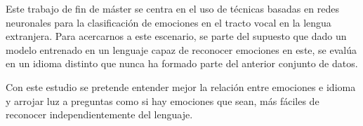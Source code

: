 \documentclass[11pt,a4paper,spanish]{book}
\begin{document}
	Este trabajo de fin de máster se centra en el uso de técnicas basadas en redes neuronales para la clasificación de emociones en el tracto vocal en la lengua extranjera. Para acercarnos a este escenario, se parte del supuesto que dado un modelo entrenado en un lenguaje capaz de reconocer emociones en este, se evalúa en un idioma distinto que nunca ha formado parte del anterior conjunto de datos. 
	
	Con este estudio se pretende entender mejor la relación entre emociones e idioma y arrojar luz a preguntas como si hay emociones que sean,  más fáciles de reconocer independientemente del lenguaje. 
	\begin{comment}
		[Estado del Arte]
		La expresión de las emociones están íntimamente relacionadas con las propiedades fonéticas en el habla donde se observan señales y patrones para marcar contrastes lingüísticos en un idioma \cite{Pell2001} por lo tanto, los efectos del lenguaje en la comunicación emocional son evidentes al haber sido observadas y medidas, las variaciones en el rango tonal y la frecuencia para expresarlas, cambiando no sólo el tono si no también el patrón lingüístico asociado \cite{Davletcharova2015}.
		[]
		 Por ejemplo la tristeza tiende a mostrarse con un tono notablemente bajo mientras que la felicidad, la sorpresa, o el enfado son producidas con un tono moderadamente alto. En general se esperaría que las expresiones de tristeza y enfado tiendan a marcar una mayor diferencia entre ellas y por lo tanto sean reconocidas con más precisión con independencia del lenguaje al estar situadas en los extremos (opuestos) del espectro.
		En literatura anterior \cite{Pell2011} se argumenta que las 6 emociones básicas felicidad, miedo, asco, sorpresa, enfado y tristeza) son exitósamente reconocidas desde la prosodia. Cabe destacar la diferencia entre prosodia y la calidad vocal, donde la primera se centra en características tales como la entonación, el estrés y el ritmo del habla mientras que la segunda se refiere al tono, energía y tempo \cite{Processing2015}.
		  
		[Estado del Arte]
		Por otro lado tanto la proporción de consonantes y vocales (que hacen variar la presión de aire que se necesita) como el ratio de sílabas por palabra en cada idioma, caracterizan la expresión oral de las emociones. Existen muchos factores relacionados con el lenguaje como la morfología o la duración del estímulo que podrían ser un impacto en la decodificación de los matices en la señal vocal, tal y como explica en \cite{Chen2017}.	
		Existe una clasificación dependiendo de la velocidad silábica en la expresión de dichos idiomas, sin embargo poco se conoce acerca de los efectos en las medidas respiratorias en el habla.Esta observación puede llevar a que se pregunte si en lenguajes tan dispares, las emociones expresadas mediante la voz puedan ser reconocidas desde el punto de vista del otro idioma.
		

\end{comment}
\end{document}
